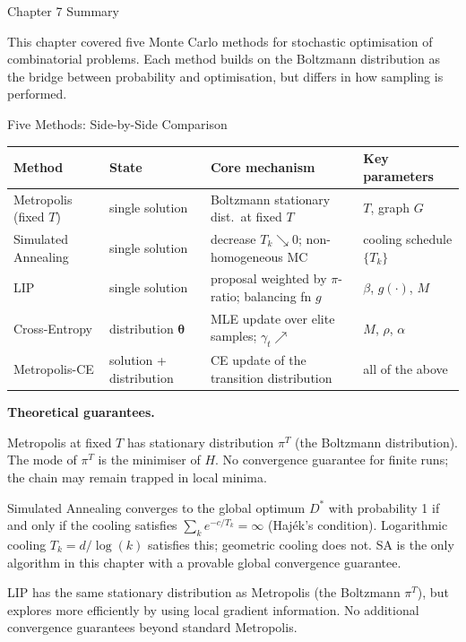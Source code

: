 \documentclass[aspectratio=169,10pt]{beamer}
\newcommand{\btheta}{\boldsymbol{\theta}}
\begin{document}
\begin{frame}[allowframebreaks]{Chapter 7 Summary}

This chapter covered five Monte Carlo methods for stochastic optimisation of
combinatorial problems.  Each method builds on the Boltzmann distribution as
the bridge between probability and optimisation, but differs in how sampling
is performed.

\begin{block}{Five Methods: Side-by-Side Comparison}
  \small
  \begin{tabular}{p{2.3cm}p{1.8cm}p{4.4cm}p{2.6cm}}
    \toprule
    Method & State & Core mechanism & Key parameters\\
    \midrule
    Metropolis (fixed $T$)
      & single solution
      & Boltzmann stationary dist.\ at fixed $T$
      & $T$, graph $G$\\[4pt]
    Simulated Annealing
      & single solution
      & decrease $T_k \searrow 0$; non-homogeneous MC
      & cooling schedule $\{T_k\}$\\[4pt]
    LIP
      & single solution
      & proposal weighted by $\pi$-ratio; balancing fn $g$
      & $\beta$, $g(\cdot)$, $M$\\[4pt]
    Cross-Entropy
      & distribution $\btheta$
      & MLE update over elite samples; $\gamma_t \nearrow$
      & $M$, $\rho$, $\alpha$\\[4pt]
    Metropolis-CE
      & solution + distribution
      & CE update of the transition distribution
      & all of the above\\
    \bottomrule
  \end{tabular}
\end{block}

\framebreak

\textbf{Theoretical guarantees.}

Metropolis at fixed $T$ has stationary distribution $\pi^T$ (the Boltzmann
distribution).  The mode of $\pi^T$ is the minimiser of $H$.  No
convergence guarantee for finite runs; the chain may remain trapped in local
minima.

Simulated Annealing converges to the global optimum $D^*$ with probability
1 if and only if the cooling satisfies $\sum_k e^{-c/T_k} = \infty$
(Haj\'{e}k's condition).  Logarithmic cooling $T_k = d/\log(k)$ satisfies
this; geometric cooling does not.  SA is the only algorithm in this chapter
with a provable global convergence guarantee.

LIP has the same stationary distribution as Metropolis (the Boltzmann
$\pi^T$), but explores more efficiently by using local gradient information.
No additional convergence guarantees beyond standard Metropolis.


\end{frame}
\end{document}

